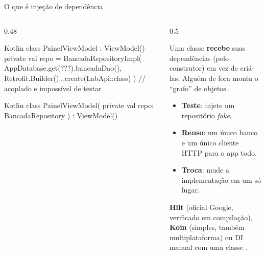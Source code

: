 \documentclass[aspectratio=169,10pt]{beamer}
\begin{document}
\begin{frame}[fragile]{O que é injeção de dependência}
  \begin{columns}[T]
    \begin{column}{0.48\textwidth}
\begin{codigo}[title=Sem DI: a classe cria o que usa]{Kotlin}
class PainelViewModel : ViewModel() {
  private val repo = BancadaRepositoryImpl(
    AppDatabase.get(???).bancadaDao(),
    Retrofit.Builder()...create(LabApi::class)
  )  // acoplado e impossível de testar
}
\end{codigo}
\begin{codigo}[title=Com DI: recebe pronto]{Kotlin}
class PainelViewModel(
  private val repo: BancadaRepository
) : ViewModel()
\end{codigo}
    \end{column}
    \begin{column}{0.5\textwidth}
      \begin{conceito}
        Uma classe \textbf{recebe} suas dependências (pelo construtor) em vez de criá-las. Alguém de fora monta o ``grafo'' de objetos.
      \end{conceito}
      \begin{itemize}
        \item \textbf{Teste}: injete um repositório \emph{fake}.
        \item \textbf{Reuso}: um único banco e um único cliente HTTP para o app todo.
        \item \textbf{Troca}: mude a implementação em um só lugar.
      \end{itemize}
      \begin{dica}[Opções]
        \textbf{Hilt} (oficial Google, verificado em compilação), \textbf{Koin} (simples, também multiplataforma) ou DI manual com uma classe .
      \end{dica}
    \end{column}
  \end{columns}
\end{frame}
\end{document}
